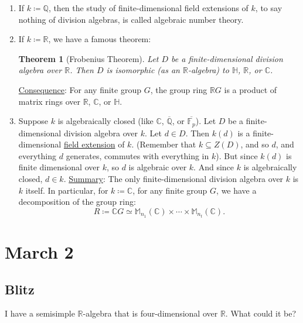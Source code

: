 \documentclass[12pt]{article}
\newcommand{\q}{\mathbb{Q}}
\newcommand{\cx}{\mathbb{C}}
\newcommand{\real}{\mathbb{R}}
\newcommand{\h}{\mathbb{H}}
\newcommand{\field}{\mathbb{F}}
\newtheorem{theorem}{Theorem}[section]
\theoremstyle{definition}
\newcommand{\m}{\mathbb{M}}
\begin{document}
\begin{enumerate}
    \item If $k \coloneqq  \q$, then the study of finite-dimensional field extensions of $k$, to say nothing of division algebras, is called algebraic number theory.
    \item If $k \coloneqq  \real$, we have a famous theorem: 
    \begin{theorem}[Frobenius Theorem]
        Let $D$ be a finite-dimensional division algebra over $\real$. Then $D$ is isomorphic (as an $\real$-algebra) to $\h$, $\real$, or $\cx$.
    \end{theorem}
    \noindent \underline{Consequence}: For any finite group $G$, the group ring $\real G$ is a product of matrix rings over $\real$, $\cx$, or $\h$.
    \item Suppose $k$ is algebraically closed (like $\cx$, $\overline{\q}$, or $\overline{\field_p}$). Let $D$ be a finite-dimensional division algebra over $k$. Let $d \in D$. Then $k(d)$ is a finite-dimensional \underline{field extension} of $k$. (Remember that $k \subseteq Z(D)$, and so $d$, and everything $d$ generates, commutes with everything in $k$). But since $k(d)$ is finite dimensional over $k$, so $d$ is algebraic over $k$. And since $k$ is algebraically closed, $d \in k$.
    \newline
    \newline
    \underline{Summary}: The only finite-dimensional division algebra over $k$ is $k$ itself. In particular, for $k \coloneqq  \cx$, for any finite group $G$, we have a decomposition of the group ring: 
    \begin{equation}
        R \coloneqq  \cx G \simeq \boxed{ \m_{n_1}(\cx) \times \dotsb \times \m_{n_t}(\cx). }
    \end{equation}
\end{enumerate}
\section{March 2}
\subsection{Blitz}
I have a semisimple $\real$-algebra that is four-dimensional over $\real$. What could it be?
\end{document}
